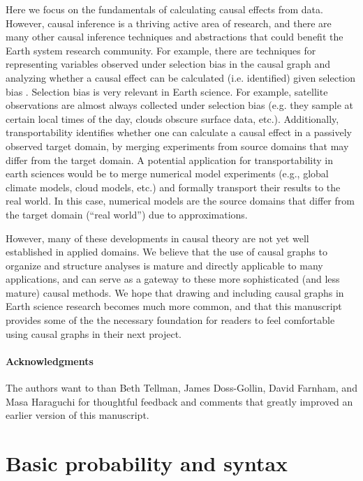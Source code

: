 \documentclass[12pt]{article}
\begin{document}
Here we focus on the fundamentals of calculating causal effects from
data. However, causal inference is a thriving active area of research,
and there are many other causal inference techniques and abstractions
that could benefit the Earth system research community. For example,
there are techniques for representing variables observed under
selection bias in the causal graph and analyzing whether a causal
effect can be calculated (i.e. identified) given selection bias
\citep[e.g.,][]{bareinboim2014recovering}. Selection bias is very
relevant in Earth science. For example, satellite observations are
almost always collected under selection bias (e.g. they sample at
certain local times of the day, clouds obscure surface data,
etc.). Additionally, transportability
\citep[e.g.,][]{bareinboim2012transportability} identifies whether one
can calculate a causal effect in a passively observed target domain,
by merging experiments from source domains that may differ from the
target domain. A potential application for transportability in earth
sciences would be to merge numerical model experiments (e.g., global
climate models, cloud models, etc.) and formally transport their
results to the real world. In this case, numerical models are the
source domains that differ from the target domain (``real world'') due
to approximations.

However, many of these developments in causal theory are not yet well
established in applied domains. We believe that the use of causal
graphs to organize and structure analyses is mature and directly
applicable to many applications, and can serve as a gateway to these
more sophisticated (and less mature) causal methods. We hope that
drawing and including causal graphs in Earth science research becomes
much more common, and that this manuscript provides some of the the
necessary foundation for readers to feel comfortable using causal
graphs in their next project.

\paragraph{Acknowledgments} The authors want to than Beth Tellman,
James Doss-Gollin, David Farnham, and Masa Haraguchi for thoughtful
feedback and comments that greatly improved an earlier version of this
manuscript.




\appendix
\section{Basic probability and syntax}
\label{prob-theory}
\end{document}
